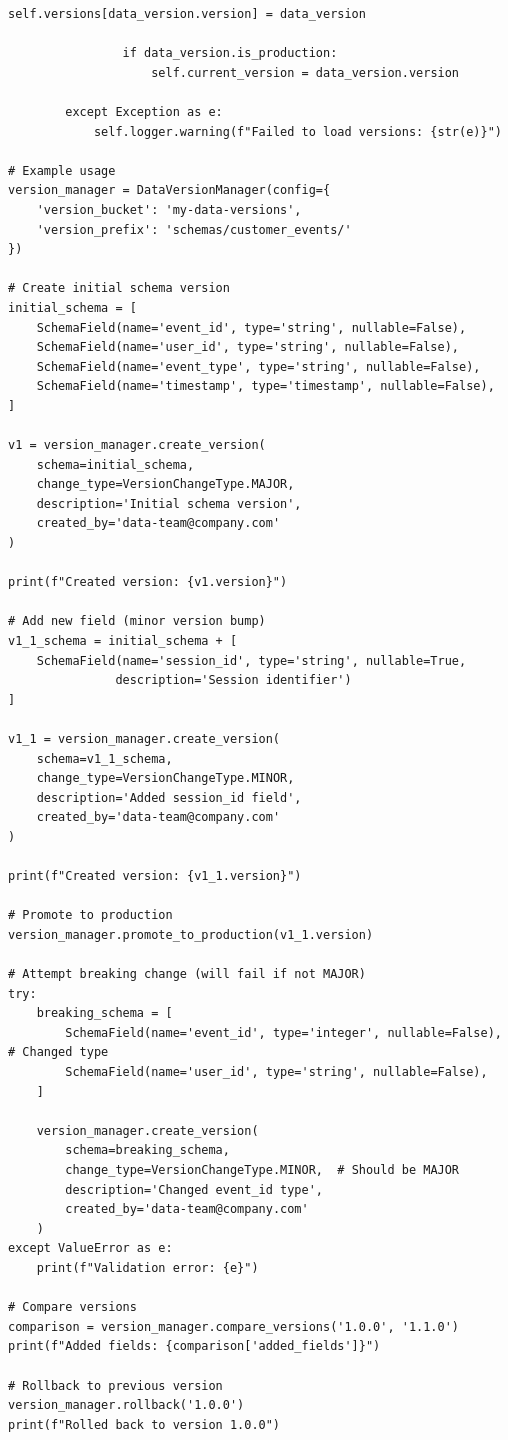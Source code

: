 \begin{lstlisting}[style=python, caption=DataVersionManager with Semantic Versioning]
                self.versions[data_version.version] = data_version

                if data_version.is_production:
                    self.current_version = data_version.version

        except Exception as e:
            self.logger.warning(f"Failed to load versions: {str(e)}")

# Example usage
version_manager = DataVersionManager(config={
    'version_bucket': 'my-data-versions',
    'version_prefix': 'schemas/customer_events/'
})

# Create initial schema version
initial_schema = [
    SchemaField(name='event_id', type='string', nullable=False),
    SchemaField(name='user_id', type='string', nullable=False),
    SchemaField(name='event_type', type='string', nullable=False),
    SchemaField(name='timestamp', type='timestamp', nullable=False),
]

v1 = version_manager.create_version(
    schema=initial_schema,
    change_type=VersionChangeType.MAJOR,
    description='Initial schema version',
    created_by='data-team@company.com'
)

print(f"Created version: {v1.version}")

# Add new field (minor version bump)
v1_1_schema = initial_schema + [
    SchemaField(name='session_id', type='string', nullable=True,
               description='Session identifier')
]

v1_1 = version_manager.create_version(
    schema=v1_1_schema,
    change_type=VersionChangeType.MINOR,
    description='Added session_id field',
    created_by='data-team@company.com'
)

print(f"Created version: {v1_1.version}")

# Promote to production
version_manager.promote_to_production(v1_1.version)

# Attempt breaking change (will fail if not MAJOR)
try:
    breaking_schema = [
        SchemaField(name='event_id', type='integer', nullable=False),  # Changed type
        SchemaField(name='user_id', type='string', nullable=False),
    ]

    version_manager.create_version(
        schema=breaking_schema,
        change_type=VersionChangeType.MINOR,  # Should be MAJOR
        description='Changed event_id type',
        created_by='data-team@company.com'
    )
except ValueError as e:
    print(f"Validation error: {e}")

# Compare versions
comparison = version_manager.compare_versions('1.0.0', '1.1.0')
print(f"Added fields: {comparison['added_fields']}")

# Rollback to previous version
version_manager.rollback('1.0.0')
print(f"Rolled back to version 1.0.0")
\end{lstlisting}

